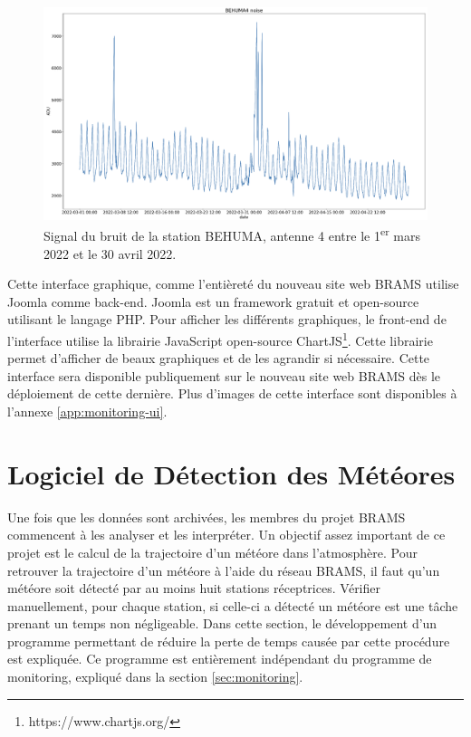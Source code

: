 \documentclass[11pt]{article}
\begin{document}
\begin{figure}[hpb]
    \begin{center}
        \includegraphics[scale=0.17]{BEHUMA4_2022-03-01_2022-04-30_noise.png}
        \caption{Signal du bruit de la station BEHUMA, antenne 4 entre le 1\textsuperscript{er} mars 2022 et le 30 avril 2022.}
        \label{fig:BEHUMA4-variations}
    \end{center}
\end{figure}

\newpage

Cette interface graphique, comme l'entièreté du nouveau site web BRAMS utilise Joomla comme back-end.
Joomla est un framework gratuit et open-source utilisant le langage PHP.
Pour afficher les différents graphiques, le front-end de l'interface utilise la librairie JavaScript open-source ChartJS\footnote{https://www.chartjs.org/}.
Cette librairie permet d'afficher de beaux graphiques et de les agrandir si nécessaire.
Cette interface sera disponible publiquement sur le nouveau site web BRAMS dès le déploiement de cette dernière.
Plus d'images de cette interface sont disponibles à l'annexe \ref{app:monitoring-ui}.

\newpage

\section{Logiciel de Détection des Météores}

Une fois que les données sont archivées, les membres du projet BRAMS commencent à les analyser et les interpréter.
Un objectif assez important de ce projet est le calcul de la trajectoire d'un météore dans l'atmosphère.
Pour retrouver la trajectoire d'un météore à l'aide du réseau BRAMS, il faut qu'un météore soit détecté par au moins huit stations réceptrices.
Vérifier manuellement, pour chaque station, si celle-ci a détecté un météore est une tâche prenant un temps non négligeable.
Dans cette section, le développement d'un programme permettant de réduire la perte de temps causée par cette procédure est expliquée.
Ce programme est entièrement indépendant du programme de monitoring, expliqué dans la section \ref{sec:monitoring}.
\end{document}
